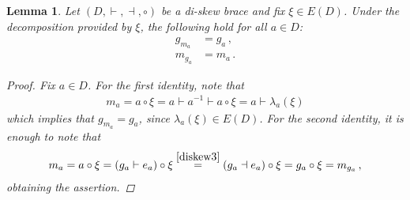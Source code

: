 \documentclass[preprint,1p]{elsarticle}
\numberwithin{equation}{section}
\newtheorem{lemma}[theor]{Lemma}
\theoremstyle{definition}               %
\newcommand{\vd}{\vdash}
\newcommand{\dv}{\dashv}
\newcommand{\overeq}[1]{\overset{#1}{=}}
\begin{document}
\begin{lemma}\label{lemma:diskew_mult}
    Let $(D,\vd,\dv,\circ)$ be a di-skew brace and fix $\xi \in E(D)$.
    Under the decomposition provided by $\xi$, the following hold for all $a \in D$:
    \begin{align}
        g_{m_a} &= g_a \label{lem:diskew_add_mul1}\,,\\
        m_{g_a} &= m_a \label{lem:diskew_add_mul2}\,.
    \end{align}
    \begin{proof}
        Fix $a \in D$.
        For the first identity, note that 
        \begin{align*}
            m_a = a \circ \xi = a \vd a^{-1} \vd a \circ \xi = a \vd \lambda_a(\xi)
        \end{align*}
        which implies that $g_{m_a} = g_a$, since $\lambda_a(\xi) \in E(D)$.
        For the second identity, it is enough to note that
        \begin{align*}
            m_a = a \circ \xi = (g_a \vd e_a) \circ \xi
            \overeq{\eqref{diskew3}} (g_a \dv e_a)\circ\xi
            = g_a\circ\xi
            = m_{g_a} \,,
        \end{align*}
        obtaining the assertion.
    \end{proof}
\end{lemma}


\medskip
\end{document}
